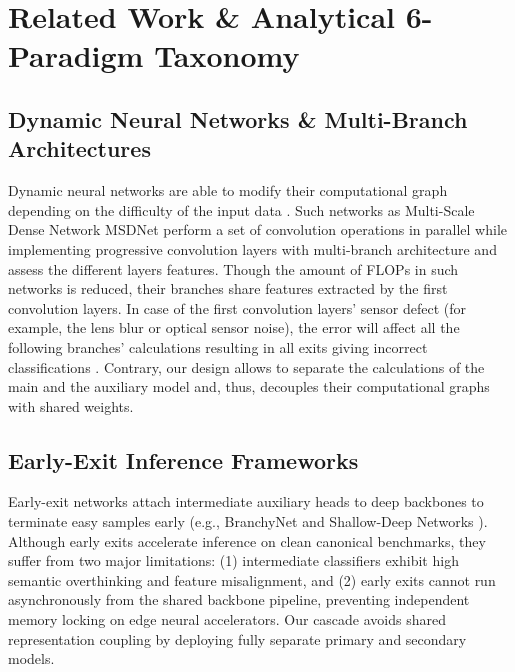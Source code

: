\documentclass[conference]{IEEEtran}
\begin{document}
\section{Related Work \& Analytical 6-Paradigm Taxonomy}
\subsection{Dynamic Neural Networks \& Multi-Branch Architectures}
Dynamic neural networks are able to modify their computational graph depending on the difficulty of the input data \cite{han2021dynamic}. Such networks as Multi-Scale Dense Network MSDNet \cite{huang2017multi} perform a set of convolution operations in parallel while implementing progressive convolution layers with multi-branch architecture and assess the different layers features. Though the amount of FLOPs in such networks is reduced, their branches share features extracted by the first convolution layers. In case of the first convolution layers' sensor defect (for example, the lens blur or optical sensor noise), the error will affect all the following branches' calculations resulting in all exits giving incorrect classifications \cite{hendrycks2019benchmarking}. Contrary, our design allows to separate the calculations of the main and the auxiliary model and, thus, decouples their computational graphs with shared weights.

\subsection{Early-Exit Inference Frameworks}
Early-exit networks attach intermediate auxiliary heads to deep backbones to terminate easy samples early (e.g., BranchyNet \cite{teerapittayanon2016branchynet} and Shallow-Deep Networks \cite{kaya2019shallow}). Although early exits accelerate inference on clean canonical benchmarks, they suffer from two major limitations: (1) intermediate classifiers exhibit high semantic overthinking and feature misalignment, and (2) early exits cannot run asynchronously from the shared backbone pipeline, preventing independent memory locking on edge neural accelerators. Our cascade avoids shared representation coupling by deploying fully separate primary and secondary models.
\end{document}
